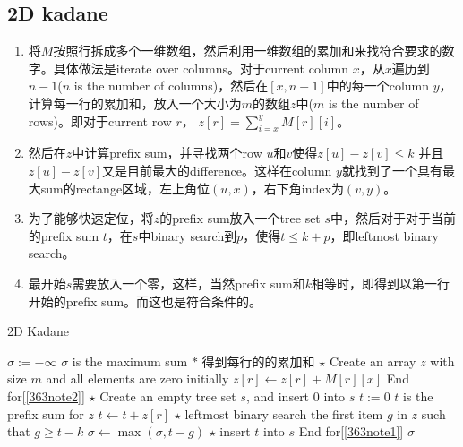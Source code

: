 \subsection{2D kadane}
\begin{enumerate}
\item 将$ M $按照行拆成多个一维数组，然后利用一维数组的累加和来找符合要求的数字。具体做法是iterate over columns。对于current column $ x $，从$x$遍历到$n-1$($ n $ is the number of columns)，然后在$[x,n-1]$中的每一个column $y$，计算每一行的累加和，放入一个大小为$m$的数组$z$中($ m $ is the number of rows)。即对于current row $ r $， $z[r]=\sum\limits_{i=x}^{y}M[r][i]$。
\item 然后在$z$中计算prefix sum，并寻找两个row $u$和$v$使得$z[u]-z[v]\leq k$ 并且$z[u]-z[v]$又是目前最大的difference。这样在column $y$就找到了一个具有最大sum的rectange区域，左上角位$(u, x)$，右下角index为$(v, y)$。
\item 为了能够快速定位，将$z$的prefix sum放入一个tree set $s$中，然后对于对于当前的prefix sum $t$，在$s$中binary search到$p$，使得$t\leq k+p$，即leftmost binary search。
\item 最开始$s$需要放入一个零，这样，当然prefix sum和$k$相等时，即得到以第一行开始的prefix sum。而这也是符合条件的。
\end{enumerate}

\setcounter{algorithm}{0}
\begin{algorithm}[H]
\caption{2D Kadane}
\begin{algorithmic}[1]
\State $\sigma:=-\infty$ \Comment $\sigma$ is the maximum sum
\State $ \ast $ 得到每行的的累加和
\State $\star$ Create an array $z$ with size $m$ and all elements are zero initially
 \label{363note1}
 \label{363note2}
\State $z[r]\gets z[r] + M[r][x]$
\EndFor \Comment End for[\ref{363note2}]
\State $\star$ Create an empty tree set $s$, and insert 0 into $s$
\State $t:=0$ \Comment $t$ is the prefix sum for $z$
\State $t\gets t+z[r]$
\State $\star$ leftmost binary search the first item $g$ in $z$ such that $g\geq t-k$
\State $\sigma\gets\max(\sigma, t-g)$
\State $\star$ insert $t$ into $s$
\EndFor
\EndFor \Comment End for[\ref{363note1}]
\EndFor
\State \Return $\sigma$
\EndProcedure
\end{algorithmic}
\end{algorithm}

